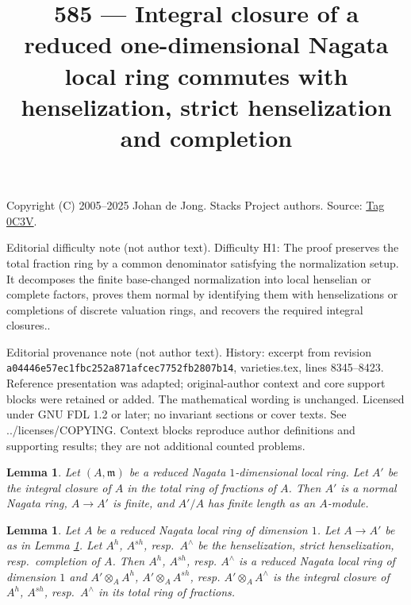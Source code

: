 \documentclass{amsart}
\theoremstyle{plain}
\newtheorem{lemma}[subsection]{Lemma}
\theoremstyle{definition}
\theoremstyle{remark}
\numberwithin{equation}{subsection}
\begin{document}
\title[Stacks Project, Tag 0C3V]{585 --- Integral closure of a reduced one-dimensional Nagata local ring commutes with henselization, strict henselization and completion}
\maketitle
\noindent Copyright (C) 2005--2025 Johan de Jong. Stacks Project authors. Source: \href{https://stacks.math.columbia.edu/tag/0C3V}{Tag 0C3V}.

\noindent Editorial difficulty note (not author text). Difficulty H1: The proof preserves the total fraction ring by a common denominator satisfying the normalization setup. It decomposes the finite base-changed normalization into local henselian or complete factors, proves them normal by identifying them with henselizations or completions of discrete valuation rings, and recovers the required integral closures..

\noindent Editorial provenance note (not author text). History: excerpt from revision \texttt{a0444\allowbreak 6e57e\allowbreak c1fbc\allowbreak 252a8\allowbreak 71afc\allowbreak ec775\allowbreak 2fb28\allowbreak 07b14}, varieties.tex, lines 8345--8423. Reference presentation was adapted; original-author context and core support blocks were retained or added. The mathematical wording is unchanged. Licensed under GNU FDL 1.2 or later; no invariant sections or cover texts. See ../licenses/COPYING. Context blocks reproduce author definitions and supporting results; they are not additional counted problems.

\begin{lemma}
\label{lemma-pre-delta-invariant}
Let $(A, \mathfrak m)$ be a reduced Nagata $1$-dimensional local ring.
Let $A'$ be the integral closure of $A$ in the total ring of fractions
of $A$. Then $A'$ is a normal Nagata ring, $A \to A'$ is finite, and
$A'/A$ has finite length as an $A$-module.
\end{lemma}

\begin{lemma}
\label{lemma-normalization-same-after-completion}
Let $A$ be a reduced Nagata local ring of dimension $1$.
Let $A \to A'$ be as in Lemma \ref{lemma-pre-delta-invariant}.
Let $A^h$, $A^{sh}$, resp.\ $A^\wedge$
be the henselization, strict henselization, resp.\ completion of $A$.
Then $A^h$, $A^{sh}$, resp. $A^\wedge$ is a reduced Nagata local
ring of dimension $1$ and
$A' \otimes_A A^h$, $A' \otimes_A A^{sh}$, resp. $A' \otimes_A A^\wedge$
is the integral closure of $A^h$, $A^{sh}$, resp.\ $A^\wedge$
in its total ring of fractions.
\end{lemma}
\end{document}
